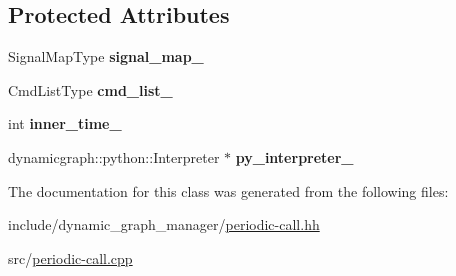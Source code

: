 \subsection*{Protected Attributes}
\begin{DoxyCompactItemize}
\item 
\mbox{\label{classdynamic__graph_1_1PeriodicCall_a6f63edf8adc5323c4e2b5dbe5bec1fb1}} 
Signal\+Map\+Type {\bfseries signal\+\_\+map\+\_\+}
\item 
\mbox{\label{classdynamic__graph_1_1PeriodicCall_a7d82343533f1913b1950589da0a6e70a}} 
Cmd\+List\+Type {\bfseries cmd\+\_\+list\+\_\+}
\item 
\mbox{\label{classdynamic__graph_1_1PeriodicCall_a5a7e82f4cf00a6a6e1d86521da303b0d}} 
int {\bfseries inner\+\_\+time\+\_\+}
\item 
\mbox{\label{classdynamic__graph_1_1PeriodicCall_a844af38083b3d1aaa8dedbb5ba35ab1f}} 
dynamicgraph\+::python\+::\+Interpreter $\ast$ {\bfseries py\+\_\+interpreter\+\_\+}
\end{DoxyCompactItemize}


The documentation for this class was generated from the following files\+:\begin{DoxyCompactItemize}
\item 
include/dynamic\+\_\+graph\+\_\+manager/\hyperlink{periodic-call_8hh}{periodic-\/call.\+hh}\item 
src/\hyperlink{periodic-call_8cpp}{periodic-\/call.\+cpp}\end{DoxyCompactItemize}
